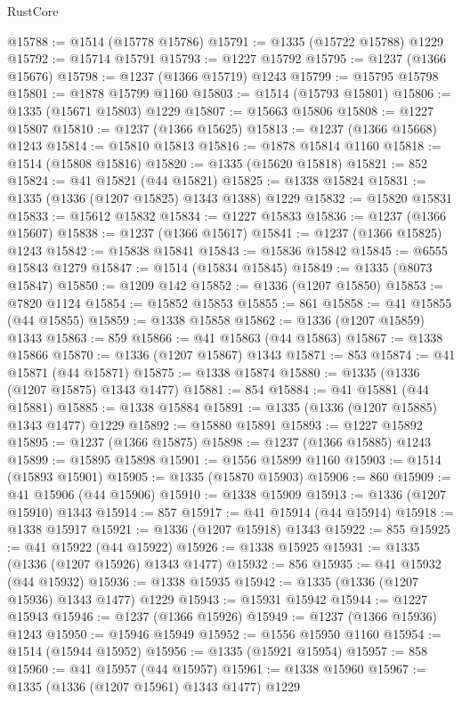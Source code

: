 \begin{lexlean}{RustCore}
\begin{coremodule}
@15788 := @1514 (@15778 @15786)
@15791 := @1335 (@15722 @15788) @1229
@15792 := @15714 @15791
@15793 := @1227 @15792
@15795 := @1237 (@1366 @15676)
@15798 := @1237 (@1366 @15719) @1243
@15799 := @15795 @15798
@15801 := @1878 @15799 @1160
@15803 := @1514 (@15793 @15801)
@15806 := @1335 (@15671 @15803) @1229
@15807 := @15663 @15806
@15808 := @1227 @15807
@15810 := @1237 (@1366 @15625)
@15813 := @1237 (@1366 @15668) @1243
@15814 := @15810 @15813
@15816 := @1878 @15814 @1160
@15818 := @1514 (@15808 @15816)
@15820 := @1335 (@15620 @15818)
@15821 := 852
@15824 := @41 @15821 (@44 @15821)
@15825 := @1338 @15824
@15831 := @1335 (@1336 (@1207 @15825) @1343 @1388) @1229
@15832 := @15820 @15831
@15833 := @15612 @15832
@15834 := @1227 @15833
@15836 := @1237 (@1366 @15607)
@15838 := @1237 (@1366 @15617)
@15841 := @1237 (@1366 @15825) @1243
@15842 := @15838 @15841
@15843 := @15836 @15842
@15845 := @6555 @15843 @1279
@15847 := @1514 (@15834 @15845)
@15849 := @1335 (@8073 @15847)
@15850 := @1209 @142
@15852 := @1336 (@1207 @15850)
@15853 := @7820 @1124
@15854 := @15852 @15853
@15855 := 861
@15858 := @41 @15855 (@44 @15855)
@15859 := @1338 @15858
@15862 := @1336 (@1207 @15859) @1343
@15863 := 859
@15866 := @41 @15863 (@44 @15863)
@15867 := @1338 @15866
@15870 := @1336 (@1207 @15867) @1343
@15871 := 853
@15874 := @41 @15871 (@44 @15871)
@15875 := @1338 @15874
@15880 := @1335 (@1336 (@1207 @15875) @1343 @1477)
@15881 := 854
@15884 := @41 @15881 (@44 @15881)
@15885 := @1338 @15884
@15891 := @1335 (@1336 (@1207 @15885) @1343 @1477) @1229
@15892 := @15880 @15891
@15893 := @1227 @15892
@15895 := @1237 (@1366 @15875)
@15898 := @1237 (@1366 @15885) @1243
@15899 := @15895 @15898
@15901 := @1556 @15899 @1160
@15903 := @1514 (@15893 @15901)
@15905 := @1335 (@15870 @15903)
@15906 := 860
@15909 := @41 @15906 (@44 @15906)
@15910 := @1338 @15909
@15913 := @1336 (@1207 @15910) @1343
@15914 := 857
@15917 := @41 @15914 (@44 @15914)
@15918 := @1338 @15917
@15921 := @1336 (@1207 @15918) @1343
@15922 := 855
@15925 := @41 @15922 (@44 @15922)
@15926 := @1338 @15925
@15931 := @1335 (@1336 (@1207 @15926) @1343 @1477)
@15932 := 856
@15935 := @41 @15932 (@44 @15932)
@15936 := @1338 @15935
@15942 := @1335 (@1336 (@1207 @15936) @1343 @1477) @1229
@15943 := @15931 @15942
@15944 := @1227 @15943
@15946 := @1237 (@1366 @15926)
@15949 := @1237 (@1366 @15936) @1243
@15950 := @15946 @15949
@15952 := @1556 @15950 @1160
@15954 := @1514 (@15944 @15952)
@15956 := @1335 (@15921 @15954)
@15957 := 858
@15960 := @41 @15957 (@44 @15957)
@15961 := @1338 @15960
@15967 := @1335 (@1336 (@1207 @15961) @1343 @1477) @1229

\end{coremodule}
\end{lexlean}
